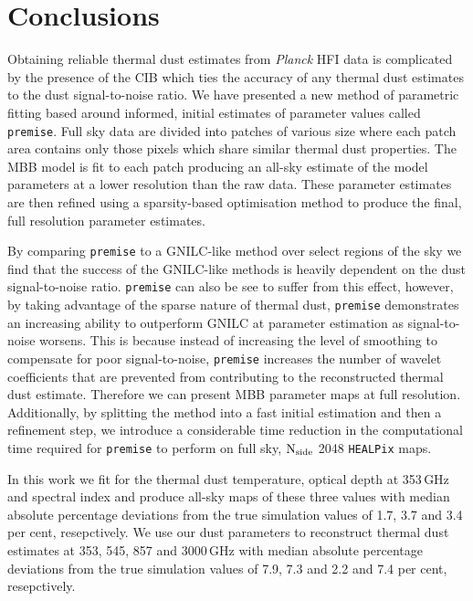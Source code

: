 \documentclass[a4paper,fleqn,usenatbib]{mnras}
\begin{document}
{\section{Conclusions}

Obtaining reliable thermal dust estimates from {\it{Planck}} HFI data is complicated by the presence of the CIB which ties the accuracy of any thermal dust estimates to the dust signal-to-noise ratio. We have presented a new method of parametric fitting based around informed, initial estimates of parameter values called {\texttt{premise}}. Full sky data are divided into patches of various size where each patch area contains only those pixels which share similar thermal dust properties. The MBB model is fit to each patch producing an all-sky estimate of the model parameters at a lower resolution than the raw data. These parameter estimates are then refined using a sparsity-based optimisation method to produce the final, full resolution parameter estimates. 

By comparing {\texttt{premise}} to a GNILC-like method over select regions of the sky we find that the success of the GNILC-like methods is heavily dependent on the dust signal-to-noise ratio. {\texttt{premise}} can also be see to suffer from this effect, however, by taking advantage of the sparse nature of thermal dust, {\texttt{premise}} demonstrates an increasing ability to outperform GNILC at parameter estimation as signal-to-noise worsens. This is because instead of increasing the level of smoothing to compensate for poor signal-to-noise, {\texttt{premise}} increases the number of wavelet coefficients that are prevented from contributing to the reconstructed thermal dust estimate. Therefore we can present MBB parameter maps at full resolution. Additionally, by splitting the method into a fast initial estimation and then a refinement step, we introduce a considerable time reduction in the computational time required for {\texttt{premise}} to perform on full sky, $\rm{N_{side}}$ 2048 {\texttt{HEALPix}} maps. 


In this work we fit for the thermal dust temperature, optical depth at 353\,GHz and spectral index and produce all-sky maps of these three values with median absolute percentage deviations from the true simulation values of 1.7, 3.7 and 3.4 per cent, resepctively. We use our dust parameters to reconstruct thermal dust estimates at 353, 545, 857 and 3000\,GHz with median absolute percentage deviations from the true simulation values of 7.9, 7.3 and 2.2 and 7.4 per cent, resepctively. 

}
\end{document}
